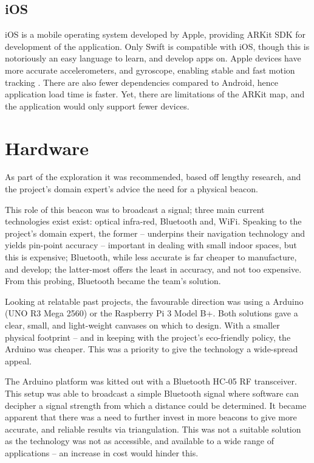 \subsection{iOS}
iOS is a mobile operating system developed by Apple, providing ARKit SDK for development of the application. Only Swift is compatible with iOS, though this is notoriously an easy language to learn, and develop apps on. Apple devices have more accurate accelerometers, and gyroscope, enabling stable and fast motion tracking \cite{pmc}. There are also fewer dependencies compared to Android, hence application load time is faster. Yet, there are limitations of the ARKit map, and the application would only support fewer devices.

\section{Hardware}
As part of the exploration it was recommended, based off lengthy research, and the project’s domain expert's advice the need for a physical beacon. 

This role of this beacon was to broadcast a signal; three main current technologies exist exist: optical infra-red, Bluetooth and, WiFi. Speaking to the project's domain expert, the former –  underpins their navigation technology and yields pin-point accuracy – important in dealing with small indoor spaces, but this is expensive; Bluetooth, while less accurate is far cheaper to manufacture, and develop; the latter-most offers the least in accuracy, and not too expensive. From this probing, Bluetooth became the team’s solution.

Looking at relatable past projects, the favourable direction was using a Arduino (UNO R3 Mega 2560) or the Raspberry Pi 3 Model B+. Both solutions gave a clear, small, and light-weight canvases on which to design. With a smaller physical footprint – and in keeping with the project’s eco-friendly policy, the Arduino was cheaper. This was a priority to give the technology a wide-spread appeal.

The Arduino platform was kitted out with a Bluetooth HC-05 RF transceiver. This setup was able to broadcast a simple Bluetooth signal where software can decipher a signal strength from which a distance could be determined. It became apparent that there was a need to further invest in more beacons to give more accurate, and reliable results via triangulation. This was not a suitable solution as the technology was not as accessible, and available to a wide range of applications – an increase in cost would hinder this.